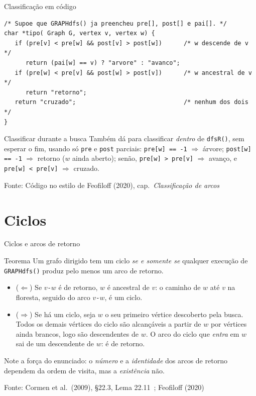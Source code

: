 \documentclass[aspectratio=169]{beamer}
\newcommand{\fonte}[1]{\vfill{\tiny\color{gray!60!black}Fonte: #1\par}}
\begin{document}
\begin{frame}[fragile]{Classificação em código}
\begin{lstlisting}
/* Supoe que GRAPHdfs() ja preencheu pre[], post[] e pai[]. */
char *tipo( Graph G, vertex v, vertex w) {
   if (pre[v] < pre[w] && post[v] > post[w])      /* w descende de v */
      return (pai[w] == v) ? "arvore" : "avanco";
   if (pre[w] < pre[v] && post[w] > post[v])      /* w ancestral de v */
      return "retorno";
   return "cruzado";                              /* nenhum dos dois */
}
\end{lstlisting}
  \begin{exampleblock}{Classificar durante a busca}
    {\scriptsize Também dá para classificar \emph{dentro} de \texttt{dfsR()}, sem
    esperar o fim, usando só \texttt{pre} e \texttt{post} parciais:
    \texttt{pre[w] == -1} $\Rightarrow$ árvore;
    \texttt{post[w] == -1} $\Rightarrow$ retorno ($w$ ainda aberto);
    senão, \texttt{pre[w] > pre[v]} $\Rightarrow$ avanço, e
    \texttt{pre[w] < pre[v]} $\Rightarrow$ cruzado.}
  \end{exampleblock}
  \fonte{Código no estilo de Feofiloff (2020), cap.\ \emph{Classificação de arcos}~\cite{feofiloff2020algoritmos}}
\end{frame}

\section{Ciclos}

\begin{frame}{Ciclos e arcos de retorno}
  \begin{block}{Teorema}
    {\small Um grafo dirigido tem um ciclo \emph{se e somente se} qualquer
    execução de \texttt{GRAPHdfs()} produz pelo menos um arco de retorno.}
  \end{block}
  {\small
  \begin{itemize}\small
    \item ($\Leftarrow$) Se $v$\texttt{-}$w$ é de retorno, $w$ é ancestral de $v$:
          o caminho de $w$ até $v$ na floresta, seguido do arco $v$\texttt{-}$w$,
          é um ciclo.
    \item ($\Rightarrow$) Se há um ciclo, seja $w$ o seu primeiro vértice
          descoberto pela busca. Todos os demais vértices do ciclo são
          alcançáveis a partir de $w$ por vértices ainda brancos, logo são
          descendentes de $w$. O arco do ciclo que \emph{entra} em $w$ sai de um
          descendente de $w$: é de retorno.
  \end{itemize}}
  {\scriptsize Note a força do enunciado: o \emph{número} e a \emph{identidade}
  dos arcos de retorno dependem da ordem de visita, mas a \emph{existência} não.}
  \fonte{Cormen et al.\ (2009), \S 22.3, Lema 22.11~\cite{cormen2009introduction}; Feofiloff (2020)~\cite{feofiloff2020algoritmos}}
\end{frame}
\end{document}

